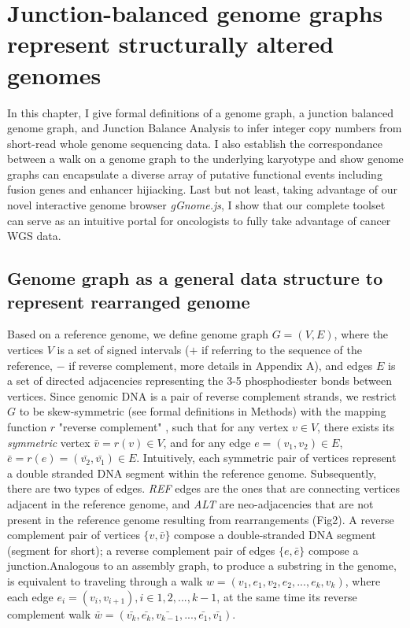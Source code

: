 \documentclass[phd,tocprelim]{cornell}
\begin{document}
\chapter{Junction-balanced genome graphs represent structurally altered genomes}
In this chapter, I give formal definitions of a genome graph, a junction balanced genome graph, and Junction Balance Analysis to infer integer copy numbers from short-read whole genome sequencing data. I also establish the correspondance between a walk on a genome graph to the underlying karyotype and show genome graphs can encapsulate a diverse array of putative functional events including fusion genes and enhancer hijiacking. Last but not least, taking advantage of our novel interactive genome browser \textit{gGnome.js}, I show that our complete toolset can serve as an intuitive portal for oncologists to fully take advantage of cancer WGS data.

\section{Genome graph as a general data structure to represent rearranged genome}
Based on a reference genome, we define genome graph $G = (V, E)$, where the vertices $V$ is a set of signed intervals ($+$ if referring to the sequence of the reference, $-$ if reverse complement, more details in Appendix A), and edges $E$ is a set of directed adjacencies representing the 3-5 phosphodiester bonds between vertices. Since genomic DNA is a pair of reverse complement strands, we restrict $G$ to be skew-symmetric (see formal definitions in Methods) with the mapping function $r$ "reverse complement" \cite{Goldberg1996-qm}, such that for any vertex $v \in V$, there exists its \textit{symmetric} vertex $\bar{v} = r(v) \in V$, and for any edge $e = (v_1, v_2) \in E$, $\bar{e} = r(e) = (\bar{v_2}, \bar{v_1}) \in E$. Intuitively, each symmetric pair of vertices represent a double stranded DNA segment within the reference genome. Subsequently, there are two types of edges. \textit{REF} edges are the ones that are connecting vertices adjacent in the reference genome, and \textit{ALT} are neo-adjacencies that are not present in the reference genome resulting from rearrangements (Fig2). A reverse complement pair of vertices $\{v, \bar{v}\}$ compose a double-stranded DNA segment (segment for short); a reverse complement pair of edges $\{e, \bar{e}\}$ compose a junction.Analogous to an assembly graph, to produce a substring in the genome, is equivalent to traveling through a walk $w = (v_1, e_1, v_2, e_2, ..., e_k, v_k)$, where each edge $e_i = (v_i, v_{i+1}), i \in 1, 2, ..., k-1$, at the same time its reverse complement walk $\bar{w} = (\bar{v_k}, \bar{e_k}, \bar{v_{k-1}}, ..., \bar{e_1}, \bar{v_1})$.
\end{document}
